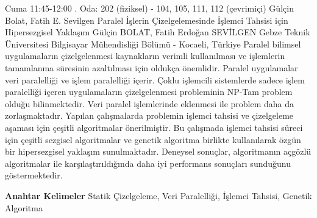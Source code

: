 
    \begin{abstract_basarim}
    {Cuma 11:45-12:00}
    {.}
    {Oda: 202 (fiziksel) - 104, 105, 111, 112 (çevrimiçi)}
    {Gülçin Bolat, Fatih E. Sevilgen}
    {Paralel İşlerin Çizelgelemesinde İşlemci Tahsisi için Hipersezgisel Yaklaşım}
    {%
    Gülçin BOLAT, Fatih Erdoğan SEVİLGEN}
    {%
    }
    {%
    Gebze Teknik Üniversitesi Bilgisayar Mühendisliği Bölümü - Kocaeli, Türkiye}
    Paralel bilimsel uygulamaların çizelgelenmesi kaynakların verimli kullanılması ve işlemlerin tamamlanma süresinin azaltılması için oldukça önemlidir. Paralel uygulamalar veri paralelliği ve işlem paralelliği içerir. Çoklu işlemcili sistemlerde sadece işlem paralelliği içeren uygulamaların çizelgelenmesi probleminin NP-Tam problem olduğu bilinmektedir. Veri paralel işlemlerinde eklenmesi ile problem daha da zorlaşmaktadır. Yapılan çalışmalarda problemin işlemci tahsisi ve çizelgeleme aşaması için çeşitli algoritmalar önerilmiştir. Bu çalışmada işlemci tahsisi süreci için çeşitli sezgisel algoritmalar ve genetik algoritma birlikte kullanılarak özgün bir hipersezgisel yaklaşım sunulmaktadır. Deneysel sonuçlar, algoritmanın açgözlü algoritmalar ile karşılaştırıldığında daha iyi performans sonuçları sunduğunu göstermektedir. 
    
            \textbf{Anahtar Kelimeler} \newline{}Statik Çizelgeleme, Veri Paralelliği, İşlemci Tahsisi, Genetik Algoritma
    \end{abstract_basarim}
    